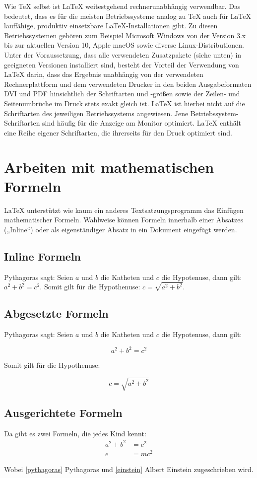 \documentclass[12pt, a4paper]{article}
\begin{document}
Wie TeX selbst ist LaTeX weitestgehend rechnerunabhängig verwendbar. Das bedeutet, dass es für die meisten Betriebssysteme analog zu TeX auch für LaTeX lauffähige, produktiv einsetzbare LaTeX-Installationen gibt. Zu diesen Betriebssystemen gehören zum Beispiel Microsoft Windows von der Version 3.x bis zur aktuellen Version 10, Apple macOS sowie diverse Linux-Distributionen. Unter der Voraussetzung, dass alle verwendeten Zusatzpakete (siehe unten) in geeigneten Versionen installiert sind, besteht der Vorteil der Verwendung von LaTeX darin, dass das Ergebnis unabhängig von der verwendeten Rechnerplattform und dem verwendeten Drucker in den beiden Ausgabeformaten DVI und PDF hinsichtlich der Schriftarten und -größen sowie der Zeilen- und Seitenumbrüche im Druck stets exakt gleich ist. LaTeX ist hierbei nicht auf die Schriftarten des jeweiligen Betriebssystems angewiesen. Jene Betriebssystem-Schriftarten sind häufig für die Anzeige am Monitor optimiert. LaTeX enthält eine Reihe eigener Schriftarten, die ihrerseits für den Druck optimiert sind. 

\pagebreak
\section{Arbeiten mit mathematischen Formeln}
LaTeX unterstützt wie kaum ein anderes Textsatzungsprogramm das Einfügen mathematischer Formeln. Wahlweise können Formeln innerhalb einer Absatzes („Inline“) oder als eigenständiger Absatz in ein Dokument eingefügt werden.

\subsection{Inline Formeln}
Pythagoras sagt: Seien $a$ und $b$ die 
Katheten und $c$ die Hypotenuse, dann gilt: $a^2+b^2=c^2$. 
Somit gilt für die Hypothenuse: $c=\sqrt{a^2+b^2}$.

\subsection{Abgesetzte Formeln}
Pythagoras sagt: Seien $a$ und $b$ die Katheten und $c$ die
Hypotenuse, dann gilt: 

\begin{displaymath}
  a^2+b^2=c^2 
\end{displaymath}
 
Somit gilt für die Hypothenuse: 

\begin{displaymath}
  c=\sqrt{a^2+b^2} 
\end{displaymath}


\subsection{Ausgerichtete Formeln}
Da gibt es zwei Formeln, die jedes Kind kennt: 
\begin{align}
  a^2 + b^2 &= c^2     \label{pythagoras}  \\  
  e &= m c^2           \label{einstein}  
\end{align}

Wobei \eqref{pythagoras} Pythagoras und \eqref{einstein} Albert Einstein zugeschrieben wird.
\end{document}
